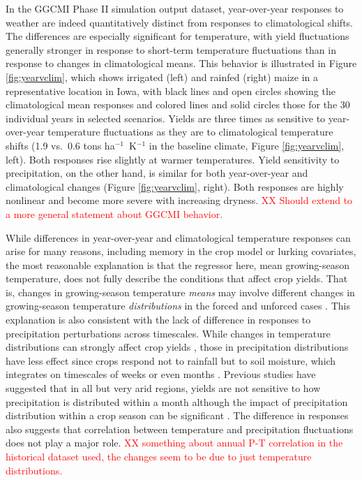 \documentclass[gmd, manuscript]{copernicus} %
\begin{document}
In the GGCMI Phase II simulation output dataset, year-over-year responses to weather are indeed quantitatively distinct from  responses to climatological shifts. 
The differences are especially significant for temperature, with yield fluctuations generally stronger in response to short-term temperature fluctuations than in response to changes in climatological means. 
This behavior is illustrated in Figure \ref{fig:yearvclim}, which shows irrigated (left) and rainfed (right) maize in a representative location in Iowa, with black lines and open circles showing the climatological mean responses and colored lines and solid circles those for the 30 individual years in selected scenarios. Yields are three times as sensitive to year-over-year temperature fluctuations as they are to climatological  temperature shifts (1.9 vs.\ 0.6 tons ha$^{-1}$\ K$^{-1}$ in the baseline climate, Figure \ref{fig:yearvclim}, left). Both responses rise slightly at warmer temperatures.
Yield sensitivity to precipitation, on the other hand, is similar for both year-over-year and climatological changes (Figure \ref{fig:yearvclim}, right). Both responses are highly nonlinear and become more severe with increasing dryness. 
\textcolor{red}{XX Should extend to a more general statement about GGCMI behavior.}

While differences in year-over-year and climatological temperature responses can arise for many reasons, including memory in the crop model or lurking covariates,  the most reasonable explanation is that the regressor here, mean growing-season temperature, does not fully describe the conditions that affect crop yields. That is, changes in growing-season temperature \textit{means}  may involve different changes in growing-season temperature \textit{distributions} in the forced and unforced cases \citep[e.g.][]{Ruane2016}. 
This explanation is also consistent with the lack of difference in responses to precipitation perturbations across timescales.  
While changes in temperature distributions can strongly affect crop yields \citep[e.g.][]{Hansen2000, Gadgil2002}, those in precipitation distributions have less effect since crops respond not to rainfall but to soil moisture, which integrates on timescales of weeks or even months \citep[e.g.][]{potter2005effects}. 
Previous studies have suggested that in all but very arid regions, yields are not sensitive to how precipitation is distributed within a month \citep{Glotter14} although the impact of precipitation distribution within a crop season can be significant \citep{CHALLINOR200499}. 
The difference in responses also suggests that correlation between temperature and precipitation fluctuations does not play a major role. \textcolor{red}{XX something about annual P-T correlation in the historical dataset used, the changes seem to be due to just temperature distributions.}
\end{document}
